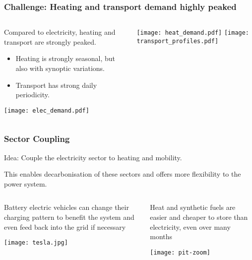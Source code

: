 \documentclass[10pt,aspectratio=169,dvipsnames]{beamer}
\let\olditem\item
\renewcommand{\item}{%
\olditem\vspace{5pt}}
\begin{document}
\begin{frame}[fragile]
  \frametitle{Challenge: Heating and transport demand highly peaked}


  \begin{columns}[T]
\begin{column}{6cm}
  Compared to electricity, heating and transport are \alert{strongly peaked}.
  \begin{itemize}
  \item   Heating is strongly seasonal, but also with synoptic variations.
    \item   Transport has strong daily periodicity.
  \end{itemize}

  \vspace{.3cm}

  \texttt{[image: elec\_demand.pdf]}

\end{column}
\begin{column}{6cm}
  \texttt{[image: heat\_demand.pdf]}
  \texttt{[image: transport\_profiles.pdf]}
\end{column}
\end{columns}



\end{frame}

\begin{frame}[fragile]
  \frametitle{Sector Coupling}

  \alert{Idea}: Couple the electricity sector to heating and mobility.

  This enables decarbonisation of these sectors \alert{and} offers more flexibility to the power system.

  \vspace{0.2cm}

  \begin{columns}[T]
\begin{column}{6cm}
  \alert{Battery electric vehicles} can change their charging pattern to benefit the
  system and even feed back into the grid if necessary

  \texttt{[image: tesla.jpg]}
\end{column}
\begin{column}{6cm}
  \alert{Heat} and \alert{synthetic fuels} are easier and cheaper to store than electricity, even over many months

  \vspace{0.5cm}

        \texttt{[image: pit-zoom]}
\end{column}
\end{columns}


\end{frame}
\end{document}
